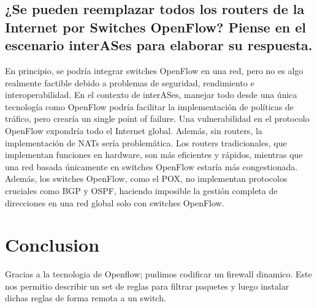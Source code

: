 \documentclass{article}
\begin{document}
\subsection{¿Se pueden reemplazar todos los routers de la Internet por Switches OpenFlow? Piense en el escenario interASes para elaborar su respuesta.}
En principio, se podría integrar switches OpenFlow en una red, pero no es algo realmente factible debido a problemas de seguridad, rendimiento e interoperabilidad. En el contexto de interASes, manejar todo desde una única tecnología como OpenFlow podría facilitar la implementación de políticas de tráfico, pero crearía un single point of failure. Una vulnerabilidad en el protocolo OpenFlow expondría todo el Internet global. Además, sin routers, la implementación de NATs sería problemática. Los routers tradicionales, que implementan funciones en hardware, son más eficientes y rápidos, mientras que una red basada únicamente en switches OpenFlow estaría más congestionada. Además, los switches OpenFlow, como el POX, no implementan protocolos cruciales como BGP y OSPF, haciendo imposible la gestión completa de direcciones en una red global solo con switches OpenFlow.


\section{Conclusion}
Gracias a la tecnologia de Openflow; pudimos codificar un firewall dinamico. Este nos permitio describir un set de reglas para filtrar paquetes y luego instalar dichas reglas de forma remota a un switch.
\end{document}
